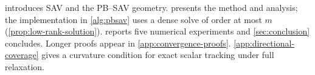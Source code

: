  introduces SAV and the PB--SAV geometry.
 presents the method and analysis; the implementation
in \cref{alg:pbsav} uses a dense solve of order at most \(m\)
(\cref{prop:low-rank-solution}).  reports five numerical
experiments and \cref{sec:conclusion} concludes. Longer proofs
appear in \ref{app:convergence-proofs}. \ref{app:directional-coverage} gives a
curvature condition for exact scalar tracking under full relaxation.
